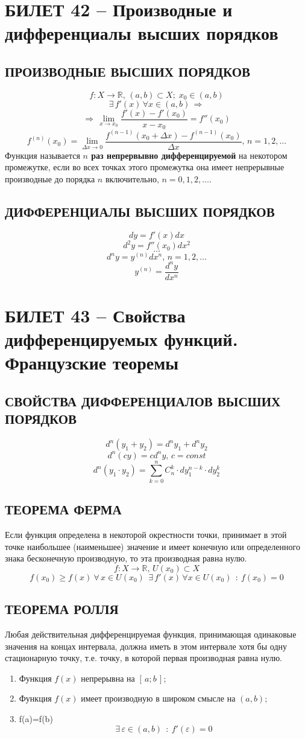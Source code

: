 \documentclass{article}
\newcommand{\R}{\mathbb R}
\begin{document}
\section{БИЛЕТ 42 -- Производные и дифференциалы высших порядков}
\subsection{ПРОИЗВОДНЫЕ ВЫСШИХ ПОРЯДКОВ}
$$ f:X\to\R,\,(a,b)\subset X;\;x_0\in(a,b)$$
$$\exists\,f'(x)\,\forall x\in (a,b)\,\Rightarrow $$
$$ \Rightarrow\,\lim_{x\to x_0} \frac{f'(x)-f'(x_0)}{x-x_0}=f''(x_0) $$
$$ f^{(n)}(x_0)=\lim_{\Delta x\to0}\frac{f^{(n-1)}(x_0+\Delta x)-f^{(n-1)}(x_0)}{\Delta x},\,n=1,2,\ldots $$
Функция называется \textbf{$n$ раз непрервывно дифференцируемой} на некотором промежутке, если во всех точках этого промежутка она имеет непрерывные производные до порядка $n$ включительно, $n=0,1,2,\ldots$.
\subsection{ДИФФЕРЕНЦИАЛЫ ВЫСШИХ ПОРЯДКОВ}
$$ dy=f'(x)dx $$
$$ d^2y=f''(x_0)dx^2 $$
$$\ldots$$
$$ d^ny=y^{(n)}dx^n,\,n=1,2,\ldots $$
$$ y^{(n)}=\frac{d^ny}{dx^n} $$
\newpage
\section{БИЛЕТ 43 -- Свойства дифференцируемых функций. Французские теоремы}
\subsection{СВОЙСТВА ДИФФЕРЕНЦИАЛОВ ВЫСШИХ ПОРЯДКОВ}
$$ d^n(y_1+y_2)=d^ny_1+d^ny_2 $$
$$ d^n(cy)=cd^ny,\,c=const $$
$$ d^n(y_1\cdot y_2) =\sum_{k=0}^n C_n^k\cdot dy_1^{n-k}\cdot d y_2^k $$
\subsection{ТЕОРЕМА ФЕРМА}
Если функция определена в некоторой окрестности точки, принимает в этой точке наибольшее (наименьшее) значение и имеет конечную или определенного знака бесконечную производную, то эта производная равна нулю. 
$$ f:X\to\R,\,U(x_0)\subset X $$
$$ f(x_0)\geqslant f(x) \:\forall\,x\in U(x_0)\:\:\exists \, f'(x)\,\forall x\in U(x_0)\:\::\: f(x_0)=0 $$
\subsection{ТЕОРЕМА РОЛЛЯ}
Любая действительная дифференцируемая функция, принимающая одинаковые значения на концах интервала, должна иметь в этом интервале хотя бы одну стационарную точку, т.е. точку, в которой первая производная равна нулю.
\begin{enumerate}
    \item Функция $f(x)$ непрерывна на $[\,a;b\,]$;
    \item Функция $f(x)$ имеет производную в широком смысле на $(a,b)$;
    \item f(a)=f(b)
    $$ \exists\,\varepsilon\in(a,b)\:\::\: f'(\varepsilon)=0 $$
\end{enumerate}
\end{document}
